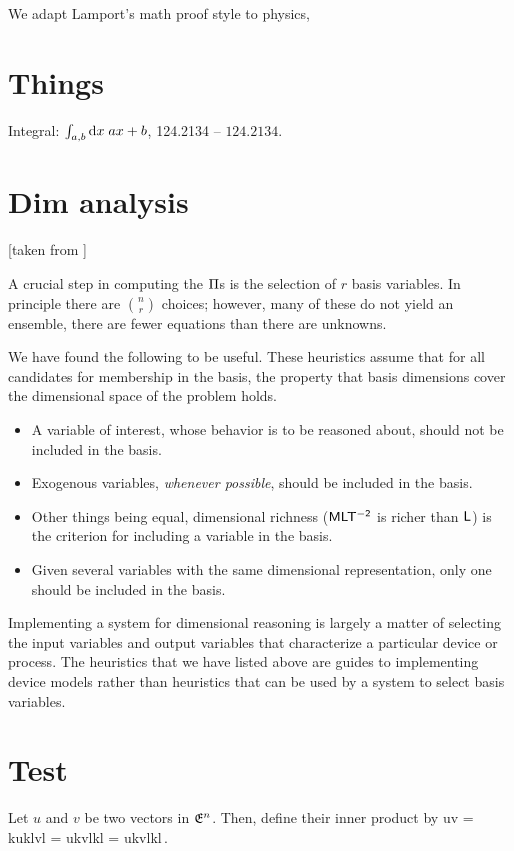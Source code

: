 We adapt Lamport's math proof style \cite{lamport:1993,lamport:2012} to physics, 


\section{Things}
%
Integral: $\lint{a,b}{ax + b}{\dx x}$, 124.2134 -- $124.2134$.


\section{Dim analysis}
%
[taken from \cite[p. 97]{bhaskar:1990}]

A crucial step in computing the $\kdim$s is the selection of $r$ basis variables. In principle there are $\binom nr$ choices; however, many of these do not yield an ensemble, \ie there are fewer equations than there are unknowns.

We have found the following  to be useful. These heuristics assume that for all candidates for membership in the basis, the property that basis dimensions cover the dimensional space of the problem holds.
%
\begin{itemize}
%
\item A variable of interest, whose behavior is to be reasoned about, should not be included in the basis.
%
\item Exogenous variables, \emph{whenever possible}, should be included in the basis. 
%
\item Other things being equal, dimensional richness (\eg $\phdim{MLT^{-2}}$ is richer than $\phdim L$) is the criterion for including a variable in the basis.
%
\item Given several variables with the same dimensional representation, only one should be included in the basis.
%
\end{itemize}

Implementing a system for dimensional reasoning is largely a matter of selecting the input variables and output variables that characterize a particular device or process. The heuristics that we have listed above are guides to implementing device models rather than heuristics that can be used by a system to select basis variables.


\section{Test}
%
Let $u$ and $v$ be two vectors in $\nespace n$. Then, define their inner product by
%
\beq
  u\iprod v = \ifvec k\ivec uk\iprod\ifvec l\ivec vl
            = \ivec uk\ivec vl\ifvec k\iprod\ifvec l
            = \ivec uk\ivec vl\ifmet kl\,.
\eeq

